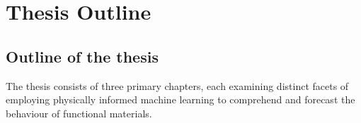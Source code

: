 


\section{Thesis Outline}
\label{sec:1.2}
 
\subsection*{Outline of the thesis}

The thesis consists of three primary chapters, each examining distinct facets of employing physically informed machine learning to comprehend and forecast the behaviour of functional materials.

